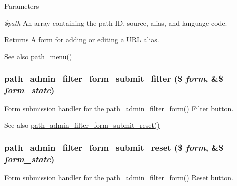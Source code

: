 \begin{DoxyParams}{Parameters}
\item[{\em \$path}]An array containing the path ID, source, alias, and language code.\end{DoxyParams}
\begin{DoxyReturn}{Returns}
A form for adding or editing a URL alias.
\end{DoxyReturn}
\begin{DoxySeeAlso}{See also}
\hyperlink{path_8module_a6c7f7ffe91d659b875298a5a51f17c99}{path\_\-menu()} 
\end{DoxySeeAlso}
\hypertarget{path_8admin_8inc_a250d1de05853ce7562fb1b9530dba273}{
\subsubsection[{path\_\-admin\_\-filter\_\-form\_\-submit\_\-filter}]{\setlength{\rightskip}{0pt plus 5cm}path\_\-admin\_\-filter\_\-form\_\-submit\_\-filter (\$ {\em form}, \/  \&\$ {\em form\_\-state})}}
\label{path_8admin_8inc_a250d1de05853ce7562fb1b9530dba273}
Form submission handler for the \hyperlink{group__forms_ga2ef41a9ef077b1b4c0fbfa2971c155d1}{path\_\-admin\_\-filter\_\-form()} Filter button.

\begin{DoxySeeAlso}{See also}
\hyperlink{path_8admin_8inc_a89dc681fab5e84263049933d97823291}{path\_\-admin\_\-filter\_\-form\_\-submit\_\-reset()} 
\end{DoxySeeAlso}
\hypertarget{path_8admin_8inc_a89dc681fab5e84263049933d97823291}{
\subsubsection[{path\_\-admin\_\-filter\_\-form\_\-submit\_\-reset}]{\setlength{\rightskip}{0pt plus 5cm}path\_\-admin\_\-filter\_\-form\_\-submit\_\-reset (\$ {\em form}, \/  \&\$ {\em form\_\-state})}}
\label{path_8admin_8inc_a89dc681fab5e84263049933d97823291}
Form submission handler for the \hyperlink{group__forms_ga2ef41a9ef077b1b4c0fbfa2971c155d1}{path\_\-admin\_\-filter\_\-form()} Reset button.

